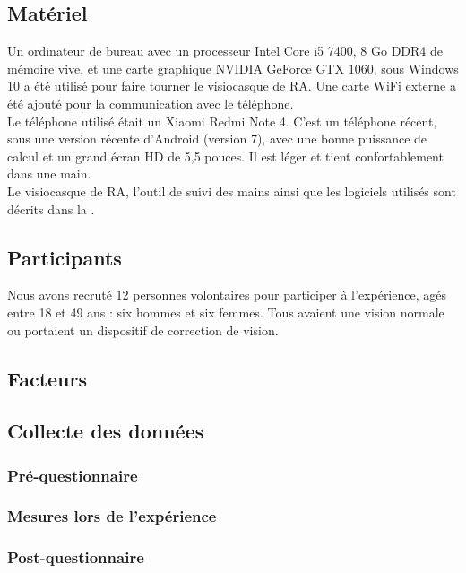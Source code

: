 \subsection{Matériel}
Un ordinateur de bureau avec un processeur Intel Core i5 7400, 8 Go DDR4 de mémoire vive, et une carte graphique NVIDIA GeForce GTX 1060, sous Windows 10 a été utilisé pour faire tourner le visiocasque de RA. Une carte WiFi externe a été ajouté pour la communication avec le téléphone.\\
Le téléphone utilisé était un Xiaomi Redmi Note 4. C'est un téléphone récent, sous une version récente d'Android (version 7), avec une bonne puissance de calcul et un grand écran HD de 5,5 pouces. Il est léger et tient confortablement dans une main.\\
Le visiocasque de RA, l'outil de suivi des mains ainsi que les logiciels utilisés sont décrits dans la .

\subsection{Participants}
Nous avons recruté 12 personnes volontaires pour participer à l'expérience, agés entre 18 et 49 ans : six hommes et six femmes. Tous avaient une vision normale ou portaient un dispositif de correction de vision.

\subsection{Facteurs}

\subsection{Collecte des données}
\subsubsection{Pré-questionnaire}

\subsubsection{Mesures lors de l'expérience}

\subsubsection{Post-questionnaire}

